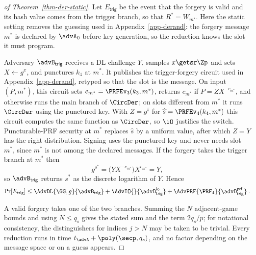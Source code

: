 \begin{proof}[of Theorem~\ref{thm-der-static}]
 Let $E_{\mathsf{trig}}$ be the event that the forgery is valid and its hash value comes from the trigger branch, so that $R^*=W_{m^*}$. Here the static setting removes the guessing used in Appendix~\ref{app-derand}: the forgery message $m^*$ is declared by $\advA_0$ before key generation, so the reduction knows the slot it must program.

Adversary $\advB_{\mathsf{trig}}$ receives a DL challenge $Y$, samples $x\getsr\Zp$ and sets $X\gets g^x$, and punctures $k_4$ at $m^*$. It publishes the trigger-forgery circuit used in Appendix~\ref{app-derand}, retyped so that the slot is the message. On input $(P,m^*)$, this circuit sets $c_{m^*}=\PRFEv_3(k_3,m^*)$, returns $c_{m^*}$ if $P=Z X^{-c_{m^*}}$, and otherwise runs the main branch of $\CircDer$; on slots different from $m^*$ it runs $\CircDer$ using the punctured key. With $Z=g^{\widehat s}$ for $\widehat s=\PRFEv_4(k_4,m^*)$ this circuit computes the same function as $\CircDer$, so $\iO$ justifies the switch. Puncturable-PRF security at $m^*$ replaces $\widehat s$ by a uniform value, after which $Z=Y$ has the right distribution. Signing uses the punctured key and never needs slot $m^*$, since $m^*$ is not among the declared messages. If the forgery takes the trigger branch at $m^*$ then
$$
g^{s^*}=\big(YX^{-c_{m^*}}\big)X^{c_{m^*}}=Y,
$$
so $\advB_{\mathsf{trig}}$ returns $s^*$ as the discrete logarithm of $Y$. Hence
$$
\Pr[E_{\mathsf{trig}}]\le
\AdvDL{\GG,g}{\advB_{\mathsf{trig}}}
+\AdvIO{}{\advD^{\mathsf{io}}_{\mathsf{trig}}}
+\AdvPRF{\PRF_4}{\advD^{\mathsf{prf}}_{\mathsf{trig}}} \;.
$$

 A valid forgery takes one of the two branches. Summing the $N$ adjacent-game bounds and using $N\le q_s$ gives the stated sum and the term $2q_s/p$; for notational consistency, the distinguishers for indices $j>N$ may be taken to be trivial. Every reduction runs in time $t_{\advA}+\poly(\secp,q_s)$, and no factor depending on the message space or on a guess appears.
\end{proof}

